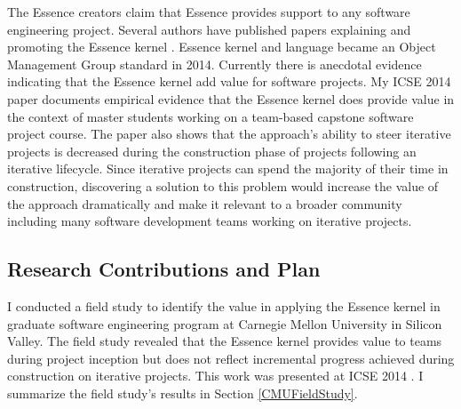 \documentclass[preprint,12pt,3p]{elsarticle}
\begin{document}
The Essence creators claim that Essence provides support to any software engineering project. Several authors have published papers explaining and promoting the Essence kernel \cite{CallToAction, JacobsonQueue, OMGStandard,  AgileSEMAT, EssenceBook, JacobsonMajorLeaugue, JacobsonNewSoftwareEngineering}. Essence kernel and language became an Object Management Group standard in 2014. Currently there is anecdotal evidence indicating that the Essence kernel add value for software projects. My ICSE 2014 paper \cite{ICSE2014} documents empirical evidence that the Essence kernel does provide value in the context of master students working on a team-based capstone software project course. 
The paper also shows that the approach's ability to steer iterative projects is decreased during the construction phase of projects following an iterative lifecycle. Since iterative projects can spend the majority of their time in construction, discovering a solution to this problem would increase the value of the approach dramatically and make it relevant to a broader community including many software development teams working on iterative projects.

\subsection{Research Contributions and Plan}

I conducted a field study to identify the value in applying the Essence kernel in graduate software engineering program at Carnegie Mellon University in Silicon Valley. The field study revealed that the Essence kernel provides value to teams during project inception but does not reflect incremental progress achieved during construction on iterative projects. This work was presented at ICSE 2014 \cite{ICSE2014}. I summarize the field study's results in Section \ref{CMUFieldStudy}.
\end{document}
